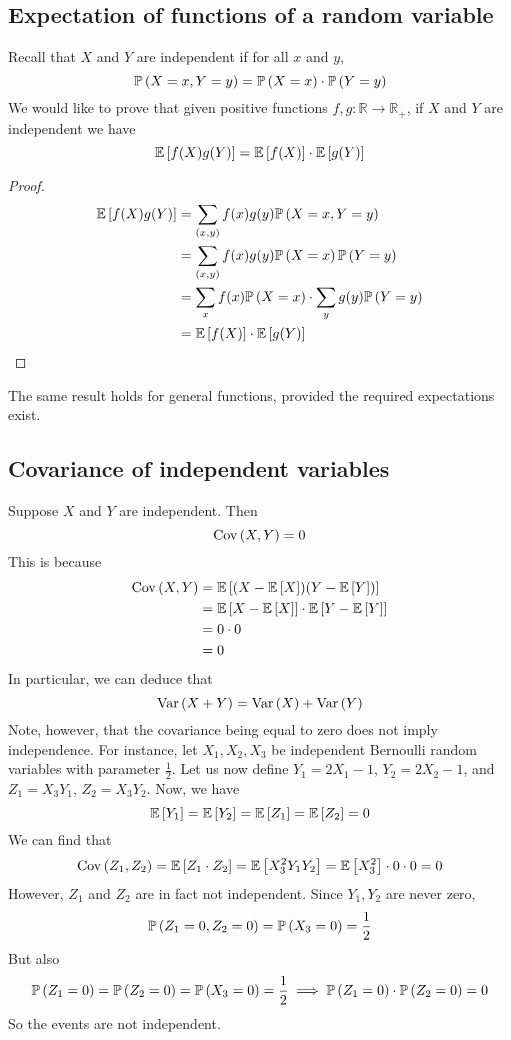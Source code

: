 \subsection{Expectation of functions of a random variable}
Recall that \(X\) and \(Y\) are independent if for all \(x\) and \(y\),
\[
	\mathbb{P}\left({X = x, Y = y}\right) = \mathbb{P}\left({X = x}\right) \cdot \mathbb{P}\left({Y = y}\right)
\]
We would like to prove that given positive functions \(f, g \colon \mathbb R \to \mathbb R_+\), if \(X\) and \(Y\) are independent we have
\[
	\mathbb{E}\left[{f(X)g(Y)}\right] = \mathbb{E}\left[{f(X)}\right] \cdot \mathbb{E}\left[{g(Y)}\right]
\]
\begin{proof}
	\begin{align*}
		\mathbb{E}\left[{f(X)g(Y)}\right] & = \sum_{(x, y)} f(x) g(y) \mathbb{P}\left({X = x, Y = y}\right)                 \\
		                  & = \sum_{(x, y)} f(x) g(y) \mathbb{P}\left({X = x}\right) \mathbb{P}\left({Y = y}\right)           \\
		                  & = \sum_{x} f(x) \mathbb{P}\left({X = x}\right) \cdot \sum_{y} g(y) \mathbb{P}\left({Y = y}\right) \\
		                  & = \mathbb{E}\left[{f(X)}\right] \cdot \mathbb{E}\left[{g(Y)}\right]
	\end{align*}
\end{proof}
\noindent The same result holds for general functions, provided the required expectations exist.

\subsection{Covariance of independent variables}
Suppose \(X\) and \(Y\) are independent.
Then
\[
	\operatorname{Cov}\left({X,Y}\right) = 0
\]
This is because
\begin{align*}
	\operatorname{Cov}\left({X,Y}\right) & = \mathbb{E}\left[{(X - \mathbb{E}\left[{X}\right])(Y - \mathbb{E}\left[{Y}\right])}\right]             \\
	          & = \mathbb{E}\left[{X - \mathbb{E}\left[{X}\right]}\right] \cdot \mathbb{E}\left[{Y - \mathbb{E}\left[{Y}\right]}\right] \\
	          & = 0 \cdot 0                                             \\
	          & = 0
\end{align*}
\noindent In particular, we can deduce that
\[
	\operatorname{Var}\left({X + Y}\right) = \operatorname{Var}\left({X}\right) + \operatorname{Var}\left({Y}\right)
\]
Note, however, that the covariance being equal to zero does not imply independence.
For instance, let \(X_1, X_2, X_3\) be independent Bernoulli random variables with parameter \(\frac{1}{2}\).
Let us now define \(Y_1 = 2X_1 - 1\), \(Y_2 = 2X_2 - 1\), and \(Z_1 = X_3 Y_1\), \(Z_2 = X_3 Y_2\).
Now, we have
\[
	\mathbb{E}\left[{Y_1}\right] = \mathbb{E}\left[{Y_2}\right] = \mathbb{E}\left[{Z_1}\right] = \mathbb{E}\left[{Z_2}\right] = 0
\]
We can find that
\[
	\operatorname{Cov}\left({Z_1, Z_2}\right) = \mathbb{E}\left[{Z_1 \cdot Z_2}\right] = \mathbb{E}\left[{X_3^2 Y_1 Y_2}\right] = \mathbb{E}\left[{X_3^2}\right] \cdot 0 \cdot 0 = 0
\]
However, \(Z_1\) and \(Z_2\) are in fact not independent.
Since \(Y_1, Y_2\) are never zero,
\[
	\mathbb{P}\left({Z_1 = 0, Z_2 = 0}\right) = \mathbb{P}\left({X_3 = 0}\right) = \frac{1}{2}
\]
But also
\[
	\mathbb{P}\left({Z_1 = 0}\right) = \mathbb{P}\left({Z_2 = 0}\right) = \mathbb{P}\left({X_3 = 0}\right) = \frac{1}{2} \implies \mathbb{P}\left({Z_1 = 0}\right) \cdot \mathbb{P}\left({Z_2 = 0}\right) = 0
\]
So the events are not independent.


